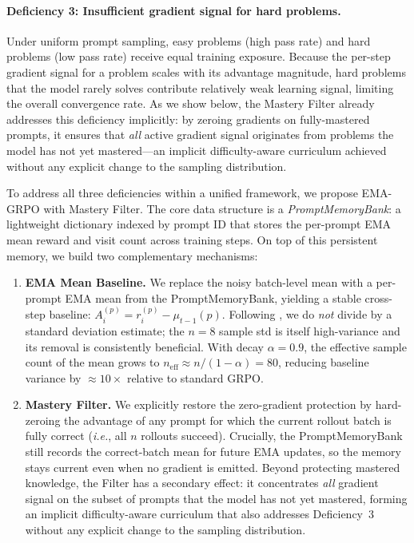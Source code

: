 \documentclass[11pt]{article}
\newcommand{\methodfull}{EMA-GRPO with Mastery Filter}
\newcommand{\ie}{\textit{i.e.}}
\theoremstyle{definition}
\begin{document}
\paragraph{Deficiency 3: Insufficient gradient signal for hard problems.}
Under uniform prompt sampling, easy problems (high pass rate) and hard
problems (low pass rate) receive equal training exposure.
Because the per-step gradient signal for a problem scales with its advantage
magnitude, hard problems that the model rarely solves contribute relatively
weak learning signal, limiting the overall convergence rate.
As we show below, the Mastery Filter already addresses this deficiency
implicitly: by zeroing gradients on fully-mastered prompts, it ensures
that \emph{all} active gradient signal originates from problems the model
has not yet mastered---an implicit difficulty-aware curriculum
achieved without any explicit change to the sampling distribution.

To address all three deficiencies within a unified framework, we propose
\methodfull{}.
The core data structure is a \emph{PromptMemoryBank}: a lightweight dictionary
indexed by prompt ID that stores the per-prompt EMA mean reward and visit
count across training steps.
On top of this persistent memory, we build two complementary mechanisms:

\begin{enumerate}
  \item \textbf{EMA Mean Baseline.} We replace the noisy batch-level mean
    with a per-prompt EMA mean from the PromptMemoryBank, yielding a stable
    cross-step baseline: $A_i^{(p)} = r_i^{(p)} - \mu_{t-1}(p)$.
    Following \citet{liu2025drgrpo}, we do \emph{not} divide by a standard
    deviation estimate; the $n=8$ sample std is itself high-variance and
    its removal is consistently beneficial.
    With decay $\alpha=0.9$, the effective sample count of the mean grows to
    $n_{\text{eff}} \approx n/(1-\alpha) = 80$, reducing baseline variance
    by $\approx10\times$ relative to standard GRPO.

  \item \textbf{Mastery Filter.} We explicitly restore the zero-gradient
    protection by hard-zeroing the advantage of any prompt for which the
    current rollout batch is fully correct (\ie, all $n$ rollouts succeed).
    Crucially, the PromptMemoryBank still records the correct-batch mean
    for future EMA updates, so the memory stays current even when no gradient
    is emitted.
    Beyond protecting mastered knowledge, the Filter has a secondary effect:
    it concentrates \emph{all} gradient signal on the subset of prompts that
    the model has not yet mastered, forming an implicit difficulty-aware
    curriculum that also addresses Deficiency~3 without any explicit
    change to the sampling distribution.
\end{enumerate}
\end{document}
